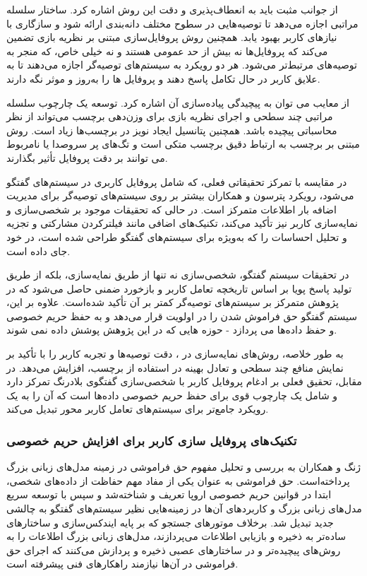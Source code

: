 از جوانب مثبت%
\cite{peterson2021user}
 باید به انعطاف‌پذیری و دقت این روش اشاره کرد. ساختار سلسله مراتبی اجازه می‌دهد تا توصیه‌هایی در سطوح مختلف دانه‌بندی ارائه شود و سازگاری با نیازهای کاربر بهبود یابد. همچنین روش پروفایل‌سازی مبتنی بر نظریه بازی تضمین می‌کند که پروفایل‌ها نه بیش از حد عمومی هستند و نه خیلی خاص، که منجر به توصیه‌های مرتبط‌تر می‌شود. هر دو رویکرد به سیستم‌های توصیه‌گر اجازه می‌دهند تا به علایق کاربر در حال تکامل پاسخ دهند و پروفایل ها را به‌روز و موثر نگه دارند.

از معایب 
\cite{peterson2021user}
 می توان به پیچیدگی پیاده‌سازی آن اشاره کرد. توسعه یک چارچوب سلسله مراتبی چند سطحی و اجرای نظریه بازی برای وزن‌دهی برچسب می‌تواند از نظر محاسباتی پیچیده باشد. همچنین پتانسیل ایجاد نویز در برچسب‌ها زیاد است. روش مبتنی بر برچسب به ارتباط دقیق برچسب متکی است و تگ‌های پر سروصدا یا نامربوط می توانند بر دقت پروفایل تأثیر بگذارند.

در مقایسه با تمرکز تحقیقاتی فعلی، که شامل پروفایل کاربری در سیستم‌های گفتگو می‌شود، رویکرد پترسون و همکاران بیشتر بر روی سیستم‌های توصیه‌گر برای مدیریت اضافه بار اطلاعات متمرکز است. در حالی که تحقیقات موجود بر شخصی‌سازی و نمایه‌سازی کاربر نیز تأکید می‌کند، تکنیک‌های اضافی مانند فیلترکردن مشارکتی و تجزیه و تحلیل احساسات را که به‌ویژه برای سیستم‌های گفتگو طراحی شده است، در خود جای داده است.

در تحقیقات سیستم گفتگو، شخصی‌سازی نه تنها از طریق نمایه‌سازی، بلکه از طریق تولید پاسخ پویا بر اساس تاریخچه تعامل کاربر و بازخورد ضمنی حاصل می‌شود که در پژوهش متمرکز بر سیستم‌های توصیه‌گر کمتر بر آن تأکید شده‌است. علاوه بر این، سیستم گفتگو حق فراموش شدن را در اولویت قرار می‌دهد و به حفظ حریم خصوصی و حفظ داده‌ها می پردازد - حوزه هایی که در این پژوهش پوشش داده نمی شوند.

به طور خلاصه، روش‌های نمایه‌سازی در 
\cite{peterson2021user}
، دقت توصیه‌ها و تجربه کاربر را با تأکید بر نمایش منافع چند سطحی و تعادل بهینه در استفاده از برچسب، افزایش می‌دهد. در مقابل، تحقیق فعلی بر ادغام پروفایل کاربر با شخصی‌سازی گفتگوی بلادرنگ تمرکز دارد و شامل یک چارچوب قوی برای حفظ حریم خصوصی داده‌ها است که آن را به یک رویکرد جامع‌تر برای سیستم‌های تعامل کاربر محور تبدیل می‌کند.

\subsubsection{تکنیک های پروفایل سازی کاربر برای افزایش حریم خصوصی}
ژنگ و همکاران %
\cite{zhang2024right}
  به بررسی و تحلیل مفهوم حق فراموشی در زمینه مدل‌های زبانی بزرگ پرداخته‌است. حق فراموشی به عنوان یکی از مفاد مهم حفاظت از داده‌های شخصی، ابتدا در قوانین حریم خصوصی اروپا%
 تعریف و شناخته‌شد و سپس با توسعه سریع مدل‌های زبانی بزرگ و کاربردهای آن‌ها در زمینه‌هایی نظیر سیستم‌های گفتگو به چالشی جدید تبدیل شد. برخلاف موتورهای جستجو که بر پایه ایندکس‌سازی و ساختارهای ساده‌تر به ذخیره و بازیابی اطلاعات می‌پردازند، مدل‌های زبانی بزرگ اطلاعات را به روش‌های پیچیده‌تر و در ساختارهای عصبی ذخیره و پردازش می‌کنند که اجرای حق فراموشی در آن‌ها نیازمند راهکارهای فنی پیشرفته است.

